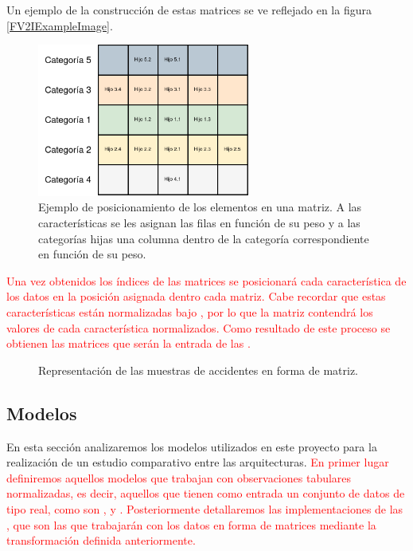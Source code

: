         Un ejemplo de la construcción de estas matrices se ve reflejado en la figura \eqref{FV2IExampleImage}.

        \begin{figure}[H]
            \centering
            \includegraphics[width=7cm]{archivos/4.Metodologia/Matrices/FV2I}
            \caption{Ejemplo de posicionamiento de los elementos en una matriz. A las características se les asignan las filas en función de su peso y a las categorías hijas una columna dentro de la categoría correspondiente en función de su peso.}
            \label{FV2IExampleImage}
        \end{figure}

        \textcolor{red}{Una vez obtenidos los índices de las matrices se posicionará cada característica de los datos en la posición asignada dentro cada matriz. Cabe recordar que estas características están normalizadas bajo , por lo que la matriz contendrá los valores de cada característica normalizados. Como resultado de este proceso se obtienen las matrices que serán la entrada de las .}

        \begin{figure}[H]
            \centering
            
            
            

            \caption{Representación de las muestras de accidentes en forma de matriz.}
            \label{SampledImagesExampleImage}
        \end{figure}

    \subsection{Modelos}


        En esta sección analizaremos los modelos utilizados en este proyecto para la realización de un estudio comparativo entre las arquitecturas. \textcolor{red}{En primer lugar definiremos aquellos modelos que trabajan con observaciones tabulares normalizadas, es decir, aquellos que tienen como entrada un conjunto de datos de tipo real, como son ,  y . Posteriormente detallaremos las implementaciones de las , que son las que trabajarán con los datos en forma de matrices mediante la transformación definida anteriormente.}

